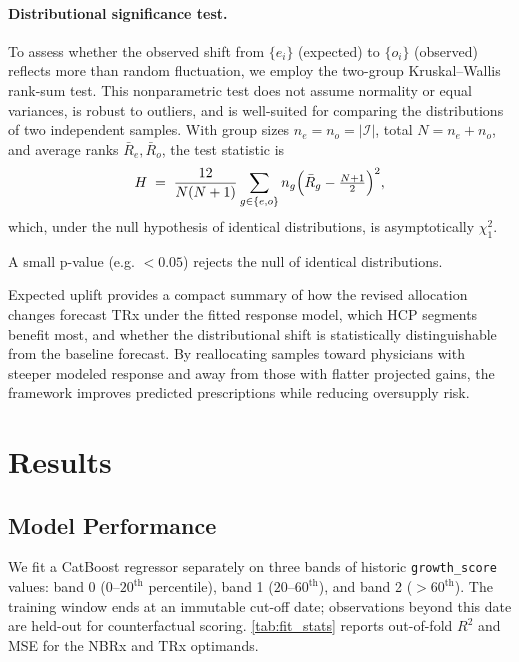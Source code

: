 \paragraph{Distributional significance test.}
To assess whether the observed shift from \(\{e_i\}\) (expected) to \(\{o_i\}\) (observed) reflects more than random fluctuation, we employ the two-group Kruskal--Wallis rank-sum test. This nonparametric test does not assume normality or equal variances, is robust to outliers, and is well-suited for comparing the distributions of two independent samples. With group sizes \(n_e = n_o = |\mathcal I|\), total \(N = n_e + n_o\), and average ranks \(\bar R_e,\bar R_o\), the test statistic is
\[
  H \;=\; \frac{12}{N(N+1)} \sum_{g\in\{e,o\}}
    n_g\Bigl(\bar R_g - \tfrac{N+1}{2}\Bigr)^2,
\]
which, under the null hypothesis of identical distributions, is asymptotically \(\chi^2_1\).

A small p-value (e.g. \(<0.05\)) rejects the null of identical distributions.

Expected uplift provides a compact summary of how the revised allocation changes forecast TRx under the fitted response model, which HCP segments benefit most, and whether the distributional shift is statistically distinguishable from the baseline forecast. By reallocating samples toward physicians with steeper modeled response and away from those with flatter projected gains, the framework improves predicted prescriptions while reducing oversupply risk.

\section{Results}\label{sec:results}

\subsection{Model Performance}\label{sec:model_perf}

We fit a CatBoost regressor separately on three bands of historic \texttt{growth\_score} values: band 0 (\(0\)--\(20^{\text{th}}\) percentile), band 1 (\(20\)--\(60^{\text{th}}\)), and band 2 (\(>60^{\text{th}}\)). The training window ends at an immutable cut-off date; observations beyond this date are held-out for counterfactual scoring. \cref{tab:fit_stats} reports out-of-fold \(R^{2}\) and MSE for the NBRx and TRx optimands.

